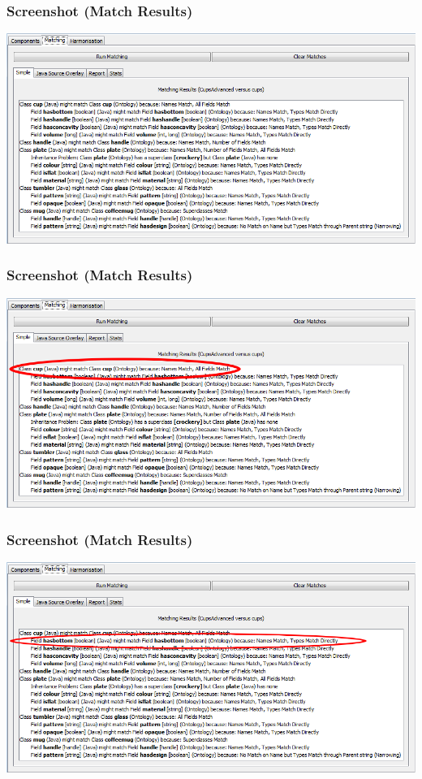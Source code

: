 \documentclass{beamer}
\begin{document}
\begin{frame}
\frametitle{Screenshot (Match Results)}
\centerline{\includegraphics[width=\paperwidth]{MatchingScreen}}
\end{frame}

\begin{frame}
\frametitle{Screenshot (Match Results)}
\centerline{\includegraphics[width=\paperwidth]{MatchingScreen-ClassHighlight}}
\end{frame}

\begin{frame}
\frametitle{Screenshot (Match Results)}
\centerline{\includegraphics[width=\paperwidth]{MatchingScreen-FieldHighlight}}
\end{frame}
\end{document}
